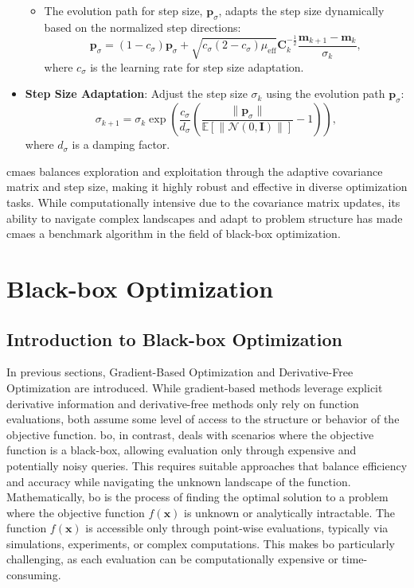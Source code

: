 \begin{itemize}
\begin{itemize}
        \item The evolution path for step size, \(\mathbf{p}_\sigma\), adapts the step size dynamically based on the normalized step directions:
        \begin{equation}
        \mathbf{p}_\sigma = (1 - c_\sigma) \mathbf{p}_\sigma + \sqrt{c_\sigma (2 - c_\sigma) \mu_\text{eff}} \mathbf{C}_k^{-\frac{1}{2}} \frac{\mathbf{m}_{k+1} - \mathbf{m}_k}{\sigma_k},
        \end{equation}
        where \(c_\sigma\) is the learning rate for step size adaptation.
    \end{itemize}
    
    \item \textbf{Step Size Adaptation}: Adjust the step size \(\sigma_k\) using the evolution path \(\mathbf{p}_\sigma\):
    \begin{equation}
    \sigma_{k+1} = \sigma_k \exp\left(\frac{c_\sigma}{d_\sigma} \left(\frac{\|\mathbf{p}_\sigma\|}{\mathbb{E}[\|\mathcal{N}(0, \mathbf{I})\|]} - 1\right)\right),
    \end{equation}
    where \(d_\sigma\) is a damping factor.
\end{itemize}

\ac{cmaes} balances exploration and exploitation through the adaptive covariance matrix and step size, making it highly robust and effective in diverse optimization tasks. While computationally intensive due to the covariance matrix updates, its ability to navigate complex landscapes and adapt to problem structure has made \ac{cmaes} a benchmark algorithm in the field of black-box optimization.


\section{Black-box Optimization}
\label{section:black_box_optimization}
\subsection{Introduction to Black-box Optimization}
In previous sections, Gradient-Based Optimization and Derivative-Free Optimization are introduced. While gradient-based methods leverage explicit derivative information and derivative-free methods only rely on function evaluations, both assume some level of access to the structure or behavior of the objective function. \acf{bo}, in contrast, deals with scenarios where the objective function is a black-box, allowing evaluation only through expensive and potentially noisy queries. This requires suitable approaches that balance efficiency and accuracy while navigating the unknown landscape of the function.  Mathematically, \ac{bo} is the process of finding the optimal solution to a problem where the objective function  $f(\mathbf{x})$ is unknown or analytically intractable. The function $f(\mathbf{x})$ is accessible only through point-wise evaluations, typically via simulations, experiments, or complex computations. This makes \ac{bo} particularly challenging, as each evaluation can be computationally expensive or time-consuming.  

